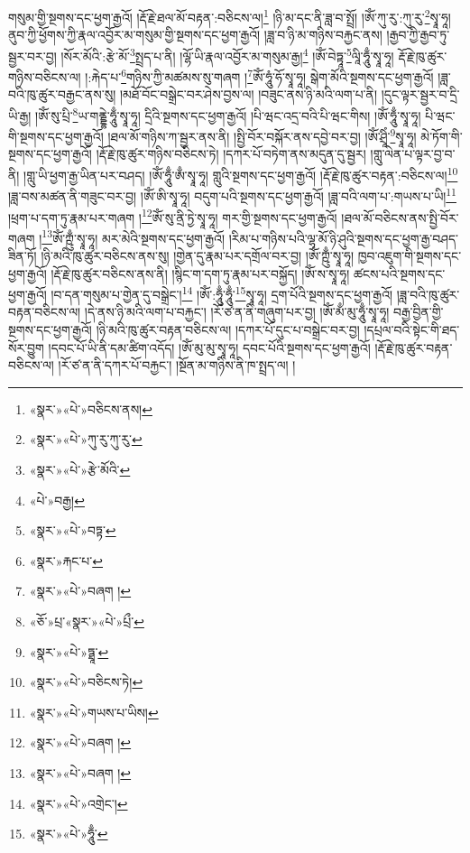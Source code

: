 གསུམ་གྱི་སྔགས་དང་ཕྱག་རྒྱའོ། །རྡོ་རྗེ་ཐལ་མོ་བརྟན་:བཅིངས་ལ།\footnote{«སྣར་»«པེ་»བཅིངས་ནས།} །ཉི་མ་དང་ནི་ཟླ་བ་སྤྲོ། །ཨོཾ་ཀུ་རུ་:ཀུ་རུ་\footnote{«སྣར་»«པེ་»ཀུ་རུ་ཀུ་རུ་}སྭཱ་ཧཱ། ནུབ་ཀྱི་ཕྱོགས་ཀྱི་རྣལ་འབྱོར་མ་གསུམ་གྱི་སྔགས་དང་ཕྱག་རྒྱའོ། །ཟླ་བ་ཉི་མ་གཉིས་བརྐྱང་ནས། །རྒྱབ་ཀྱི་རྒྱབ་ཏུ་སྦྱར་བར་བྱ། །སོར་མོའི་:རྩེ་མོ་\footnote{«སྣར་»«པེ་»རྩེ་མོའི་}སྤྲད་པ་ནི། །ལྷོ་ཡི་རྣལ་འབྱོར་མ་གསུམ་རྒྱ།\footnote{«པེ་»བརྒྱ།} །ཨོཾ་བེཏྟཱ་\footnote{«སྣར་»«པེ་»བཏྟ་}ལཱི་ཧཱུྃ་སྭཱ་ཧཱ། རྡོ་རྗེ་ཁུ་ཚུར་གཉིས་བཅིངས་ལ། །:རྐེད་པ་\footnote{«སྣར་»རྐང་པ་}གཉིས་ཀྱི་མཚམས་སུ་གཞག །\footnote{«སྣར་»«པེ་»བཞག །}ཨོཾ་ཧཱུཾ་ཧོ་སྭཱ་ཧཱ། སྒེག་མོའི་སྔགས་དང་ཕྱག་རྒྱའོ། །ཟླ་བའི་ཁུ་ཚུར་བརྒྱང་ནས་སུ། །མཐོ་བོང་བསྒྲེང་བར་ཤེས་བྱས་ལ། །བཟུང་ནས་ཉི་མའི་ལག་པ་ནི། །དུང་ལྟར་སྦྱར་བ་དྲི་ཡི་རྒྱ། །ཨོཾ་སུ་པྲི་\footnote{«ཅོ་»པྲ་«སྣར་»«པེ་»པྲྀ་}ཡ་གནྡྷེ་ཧཱུྃ་སྭཱ་ཧཱ། དྲིའི་སྔགས་དང་ཕྱག་རྒྱའོ། །པི་ཝང་འདྲ་བའི་པི་ཝང་གིས། །ཨོཾ་ཧཱུྃ་སྭཱ་ཧཱ། པི་ཝང་གི་སྔགས་དང་ཕྱག་རྒྱའོ། །ཐལ་མོ་གཉིས་ཀ་སྦྱར་ནས་ནི། །སྤྱི་བོར་བསྐོར་ནས་དབྱེ་བར་བྱ། །ཨོཾ་ཤྲཱིཾ་\footnote{«སྣར་»«པེ་»ཏྠཱ་}སྭཱ་ཧཱ། མེ་ཏོག་གི་སྔགས་དང་ཕྱག་རྒྱའོ། །རྡོ་རྗེ་ཁུ་ཚུར་གཉིས་བཅིངས་ཏེ། །དཀར་པོ་བཏེག་ནས་མདུན་དུ་སྦྱར། །གླུ་ལེན་པ་ལྟར་བྱ་བ་ནི། །གླུ་ཡི་ཕྱག་རྒྱ་ཡིན་པར་བཤད། །ཨོཾ་ཧཱུྃ་ཨྃ་སྭཱ་ཧཱ། གླུའི་སྔགས་དང་ཕྱག་རྒྱའོ། །རྡོ་རྗེ་ཁུ་ཚུར་བརྟན་:བཅིངས་ལ།\footnote{«སྣར་»«པེ་»བཅིངས་ཏེ།} །ཟླ་བས་མཚན་ནི་གཟུང་བར་བྱ། །ཨོཾ་ཨི་སྭཱ་ཧཱ། བདུག་པའི་སྔགས་དང་ཕྱག་རྒྱའོ། །ཟླ་བའི་ལག་པ་:གཡས་པ་ཡི།\footnote{«སྣར་»«པེ་»གཡས་པ་ཡིས།} །ཕྲག་པ་དག་ཏུ་རྣམ་པར་གཞག །\footnote{«སྣར་»«པེ་»བཞག །}ཨོཾ་སུ་ནྲི་ཏྱེ་སྭཱ་ཧཱ། གར་གྱི་སྔགས་དང་ཕྱག་རྒྱའོ། །ཐལ་མོ་བཅིངས་ནས་སྤྱི་བོར་གཞག །\footnote{«སྣར་»«པེ་»བཞག །}ཨོཾ་ཀྵུྃ་སྭཱ་ཧཱ། མར་མེའི་སྔགས་དང་ཕྱག་རྒྱའོ། །རིམ་པ་གཉིས་པའི་ལྷ་མོ་ཉི་ཤུའི་སྔགས་དང་ཕྱག་རྒྱ་བཤད་ཟིན་ཏོ། །ཉི་མའི་ཁུ་ཚུར་བཅིངས་ནས་སུ། །གྱེན་དུ་རྣམ་པར་དགྲོལ་བར་བྱ། །ཨོཾ་ཀྵུྃ་སྭཱ་ཧཱ། ཁྱབ་འཇུག་གི་སྔགས་དང་ཕྱག་རྒྱའོ། །རྡོ་རྗེ་ཁུ་ཚུར་བཅིངས་ནས་ནི། །སྙིང་ག་དག་ཏུ་རྣམ་པར་བསྐྱོད། །ཨོཾ་ས་སྭཱ་ཧཱ། ཚངས་པའི་སྔགས་དང་ཕྱག་རྒྱའོ། །བ་དན་གསུམ་པ་གྱེན་དུ་བསྒྲེང་།\footnote{«སྣར་»«པེ་»འགྲེང་།} །ཨོཾ་:ཧཱུྃ་ཧཱུྃ་\footnote{«སྣར་»«པེ་»ཧཱུྃ་}སྭཱ་ཧཱ། དྲག་པོའི་སྔགས་དང་ཕྱག་རྒྱའོ། །ཟླ་བའི་ཁུ་ཚུར་བརྟན་བཅིངས་ལ། །དེ་ནས་ཉི་མའི་ལག་པ་བརྐྱང་། །རོ་ཙ་ན་ནི་གཞུག་པར་བྱ། །ཨོཾ་མྃ་མུ་ཧཱུྃ་སྭཱ་ཧཱ། བརྒྱ་བྱིན་གྱི་སྔགས་དང་ཕྱག་རྒྱའོ། །ཉི་མའི་ཁུ་ཚུར་བརྟན་བཅིངས་ལ། །དཀར་པོ་དུང་པ་བསྒྲེང་བར་བྱ། །དཔྲལ་བའི་སྟེང་གི་ཐད་སོར་བྱུག །དབང་པོ་ཡི་ནི་དམ་ཚིག་འདོད། །ཨོཾ་མུ་མུ་སྭཱ་ཧཱ། དབང་པོའི་སྔགས་དང་ཕྱག་རྒྱའོ། །རྡོ་རྗེ་ཁུ་ཚུར་བརྟན་བཅིངས་ལ། །རོ་ཙ་ན་ནི་དཀར་པོ་བརྐྱང་། །སྔོན་མ་གཉིས་ནི་ཁ་སྤྲད་ལ། །
